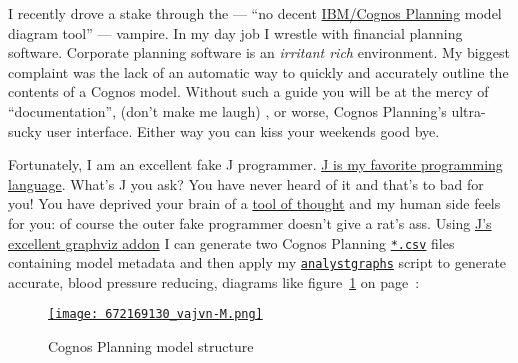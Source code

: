 

I recently drove a stake through the --- ``no decent
\href{http://www-01.ibm.com/software/data/cognos/products/cognos-8-planning/}{IBM/Cognos
Planning} model diagram tool'' --- vampire. In my day job I wrestle with
financial planning software. Corporate planning software is an
\emph{irritant rich} environment. My biggest complaint was the lack of an
automatic way to quickly and accurately outline the contents of a Cognos
model. Without such a guide you will be at the mercy of
``documentation'', (don't make me laugh) , or worse, Cognos Planning's
ultra-sucky user interface. Either
way you can kiss your weekends good bye.

Fortunately, I am an excellent fake J programmer.
\href{https://www.jsoftware.com/}{J is my favorite programming language}.
What's J you ask? You have never heard of it and that's to bad for you!
You have deprived your brain of a
\href{https://en.wikipedia.org/wiki/Kenneth\_E.\_Iverson}{tool of
thought} and my human side feels for you: of course the outer fake
programmer doesn't give a rat's ass. Using
\href{https://www.jsoftware.com/jwiki/Addons/graphics/graphviz}{J's
excellent graphviz addon} I can generate two Cognos Planning
\texttt{\href{https://fileinfo.com/extension/csv}{*.csv}} files
containing model metadata and then apply my
\texttt{\href{https://github.com/bakerjd99/jacks/blob/master/graphviz/analystgraphs.ijs}{analystgraphs}} script
to generate accurate, blood pressure reducing, diagrams like figure~\ref{fig:1698X1} on page~\pageref{fig:1698X1}:


\begin{figure}[htbp]
\centering
\href{http://conceptcontrol.smugmug.com/Other/utilimages/8074217\_BQjXN/1/\#672169130\_vajvn-A-LB}{\texttt{[image: 672169130\_vajvn-M.png]}}
\caption{Cognos Planning model structure}
\label{fig:1698X1}
\end{figure}

